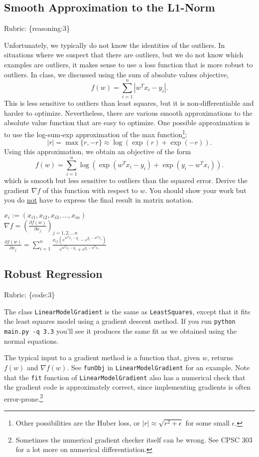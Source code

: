 \documentclass{article}
\def\rubric#1{\gre{Rubric: \{#1\}}}{}
\def\blu#1{{\color{blu}#1}}
\def\gre#1{{\color{gre}#1}}
\def\red#1{{\color{red}#1}}
\begin{document}
\subsection{Smooth Approximation to the L1-Norm}
\rubric{reasoning:3}

Unfortunately, we typically do not know the identities of the outliers. In situations where we suspect that there are outliers, but we do not know which examples are outliers, it makes sense to use a loss function that is more robust to outliers. In class, we discussed using the sum of absolute values objective,
\[
f(w) = \sum_{i=1}^n |w^Tx_i - y_i|.
\]
This is less sensitive to outliers than least squares, but it is non-differentiable and harder to optimize. Nevertheless, there are various smooth approximations to the absolute value function that are easy to optimize. One possible approximation is to use the log-sum-exp approximation of the max function\footnote{Other possibilities are the Huber loss, or $|r|\approx \sqrt{r^2+\epsilon}$ for some small $\epsilon$.}:
\[
|r| = \max\{r, -r\} \approx \log(\exp(r) + \exp(-r)).
\]
Using this approximation, we obtain an objective of the form
\[
f(w) {=} \sum_{i=1}^n  \log\left(\exp(w^Tx_i - y_i) + \exp(y_i - w^Tx_i)\right).
\]
which is smooth but less sensitive to outliers than the squared error. \blu{Derive
 the gradient $\nabla f$ of this function with respect to $w$. You should show your work but you do \underline{not} have to express the final result in matrix notation.}
 
 \red{$x_i := (x_{i1},x_{i2},x_{i3},...,x_{in})$\\$\nabla f = (\frac{\partial f(w)}{\partial x_j})_{j=1,2,...n}$\\
 $\frac{\partial f(w)}{\partial x_j} = \sum_{i=1}^n \frac{x_{ij}(e^{w^Tx_i-y_i}-e^{y_i-w^Tx_i})}{e^{w^Tx_i-y_i}+e^{y_i-w^Tx_i}}$}

\subsection{Robust Regression}
\rubric{code:3}

The class \texttt{LinearModelGradient} is the same as \texttt{LeastSquares}, except that it fits the least squares model using a gradient descent method. If you run \verb|python main.py -q 3.3| you'll see it produces the same fit as we obtained using the normal equations.

The typical input to a gradient method is a function that, given $w$, returns $f(w)$ and $\nabla f(w)$. See \texttt{funObj} in \texttt{LinearModelGradient} for an example. Note that the \texttt{fit} function of \texttt{LinearModelGradient} also has a numerical check that the gradient code is approximately correct, since implementing gradients is often error-prone.\footnote{Sometimes the numerical gradient checker itself can be wrong. See CPSC 303 for a lot more on numerical differentiation.}
\end{document}
